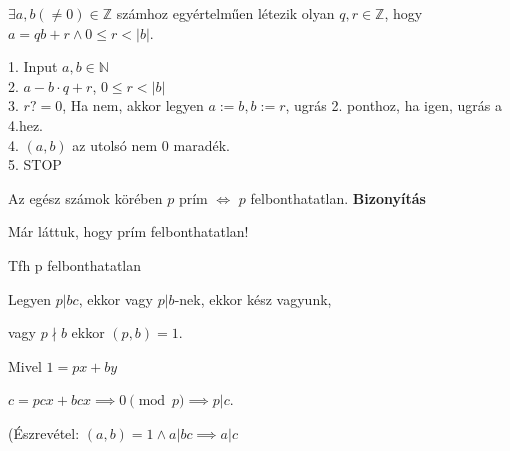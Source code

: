 \begin{frame}
  \begin{tcolorbox}[title={Tétel: Maradékos osztás $\mathbb{Z}$-ben}]
    ${\exists}a, b({\neq}0) \in \mathbb{Z}$ számhoz egyértelműen létezik olyan $q, r \in \mathbb{Z}$, hogy\\
    $a = qb + r \land 0 \leq r < |b|$.
  \end{tcolorbox}
\end{frame}

\begin{frame}
  \begin{tcolorbox}[title={Euklideszi algoritmus}]
    1. Input $a, b \in \mathbb{N}$\\
    2. $a - b \cdot q + r$, $0 \leq r < |b|$\\
    3. $r ?= 0$, Ha nem, akkor legyen $a := b, b := r$, ugrás 2. ponthoz, ha igen, ugrás a 4.hez.\\
    4. $(a, b)$ az utolsó nem $0$ maradék.\\
    5. STOP
  \end{tcolorbox}
\end{frame}

\begin{frame}
  \begin{tcolorbox}[title={Tétel: Prím és irreducibilis elem $\mathbb{Z}$-ben}]
    Az egész számok körében $p$ prím $\iff$ $p$ felbonthatatlan.
  \tcblower
    \textbf{Bizonyítás}
    \mmedskip
  
    Már láttuk, hogy prím felbonthatatlan!\\
    \msmallskip
    
    Tfh p felbonthatatlan\\
    \msmallskip
    
    Legyen $p|bc$, ekkor vagy $p | b$-nek, ekkor kész vagyunk,\\
    \msmallskip
    
    vagy $p \nmid b$ ekkor $(p,b) = 1$.\\
    \msmallskip

    Mivel $1 = px + by$\\
    \msmallskip

    $c = pcx +bcx \implies 0 \pmod{p} \implies p | c$.\\
    \mmedskip
    
    (Észrevétel: $(a, b) = 1 \land a | bc \implies a | c$
  \end{tcolorbox}
\end{frame}

